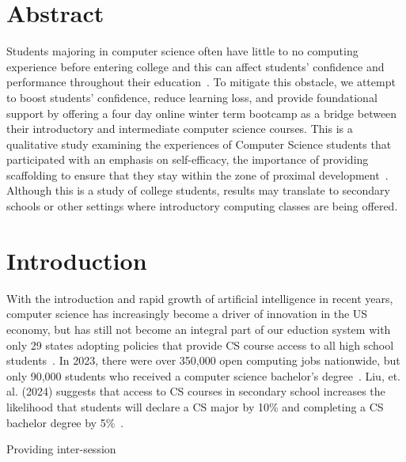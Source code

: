 \documentclass[12pt]{article}
\title{}
\date{\today}
\begin{document}
\section{Abstract}
Students majoring in computer science often have little to no computing
experience before entering college and this can affect students' confidence and
performance throughout their education~\cite{alvarado}.  To mitigate this
obstacle, we attempt to boost students’ confidence, reduce learning loss, and
provide foundational support by offering a four day online winter term bootcamp
as a bridge between their introductory and intermediate computer science
courses.  This is a qualitative study examining the experiences of Computer
Science students that participated with an emphasis on self-efficacy, the
importance of providing scaffolding to ensure that they stay within the zone of
proximal development~\cite{vygotsky, wood1975, wood1976}.  Although this is a
study of college students, results may translate to secondary schools or other
settings where introductory computing classes are being offered.

\section{Introduction}
With the introduction and rapid growth of artificial intelligence in recent
years, computer science has increasingly become a driver of innovation in the US
economy, but has still not become an integral part of our eduction
system with only 29 states adopting policies that provide CS course access to all
high school students~\cite{code}.  In 2023, there were over 350,000 open
computing jobs nationwide, but only 90,000 students who received a computer
science bachelor's degree~\cite{code}.  Liu, et. al. (2024) suggests
that access to CS courses in secondary school increases the likelihood that
students will declare a CS major by 10\% and completing a CS bachelor degree by
5\%~\cite{liu}.

Providing inter-session 

\printbibliography
\end{document}
